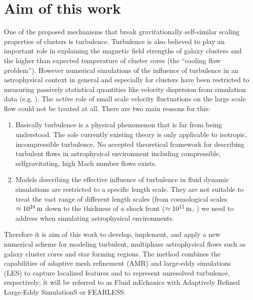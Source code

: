 \section{Aim of this work}
One of the proposed mechanisms that break gravitationally self-similar scaling
properties of clusters is turbulence. Turbulence is also believed to
play an important role in explaining the magnetic field strengths of galaxy
clusters and the higher than expected temperature of cluster cores (the 
``cooling flow problem''). However numerical simulations of the
influence of turbulence in an astrophysical context in general and especially
for clusters have been restricted to measuring passively statistical
quantities
like velocity dispersion from simulation data (e.g. \citet{Dolag2005}). 
The active role of small scale velocity fluctuations on the large scale flow
could not be treated at all. There are two main reasons for this:
\begin{enumerate}
\item Basically turbulence is a physical phenomenon that is far from
being understood. The sole currently  existing theory is only
applicable to isotropic, incompressible turbulence. No accepted theoretical
framework for
describing turbulent flows in astrophysical environment including compressible,
selfgravitating, high Mach number flows exists. 
\item Models describing the effective influence of turbulence in fluid dynamic
simulations are restricted to a specific length scale. They are not suitable to
treat the vast range of different length scales (from cosmological scales
$\approx \unit[10^{24}]{m}$
down to the thickness of a shock front ($\approx \unit[10^{11}]{m}$,
\citet{Medvedev2006}) we need to address
when simulating astrophysical environments.
\end{enumerate}
Therefore it is aim of this work to develop, implement, and apply a new
numerical scheme for modeling turbulent, multiphase astrophysical flows such as
galaxy cluster cores and star forming regions. The method combines the
capabilities of adaptive mesh refinement (AMR) and large-eddy simulations (LES)
to capture localized features and to represent unresolved turbulence,
respectively; it will be referred to as Fluid mEchanics with
Adaptively Refined Large-Eddy SimulationS or FEARLESS. 


